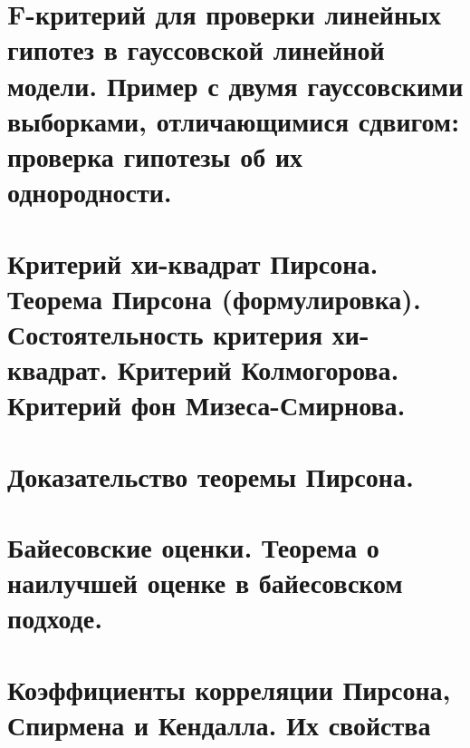 \section{F-критерий для проверки линейных гипотез в гауссовской линейной модели. Пример с двумя гауссовскими выборками, отличающимися сдвигом: проверка гипотезы об их однородности.}


\section{Критерий хи-квадрат Пирсона. Теорема Пирсона (формулировка). Состоятельность критерия хи-квадрат. Критерий Колмогорова. Критерий фон Мизеса-Смирнова.}


\section{Доказательство теоремы Пирсона.}

\section{Байесовские оценки. Теорема о наилучшей оценке в байесовском подходе.}

\section{Коэффициенты корреляции Пирсона, Спирмена и Кендалла. Их свойства}

